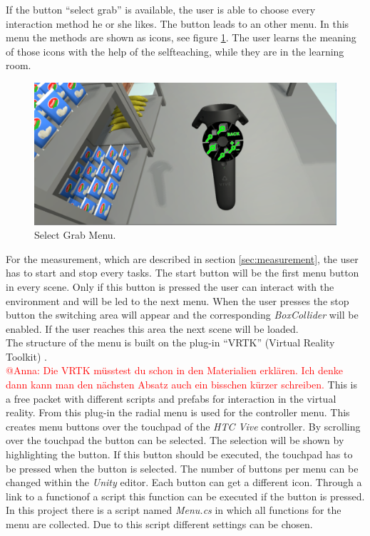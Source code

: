If the button ``select grab'' is available, the user is able to choose every interaction method he or she likes. The button leads to an other menu. In this menu the methods are shown as icons, see figure \ref{fig:grabMenu}. The user learns the meaning of those icons with the help of the selfteaching, while they are in the learning room. 

\begin{figure}[H] 
	\center 
	\includegraphics[width=12cm]{Images/Menu2.PNG}
	\caption[Select Grab Menu.]{Select Grab Menu.}
	\label{fig:grabMenu}
\end{figure}

For the measurement, which are described in section \ref{sec:measurement}, the user has to start and stop every tasks. The start button will be the first menu button in every scene. Only if this button is pressed the user can interact with the environment and will be led to the next menu. When the user presses the stop button the switching area will appear and the corresponding \textit{BoxCollider} \cite{website:BoxCollider} will be enabled. If the user reaches this area the next scene will be loaded.\\
The structure of the menu is built on the plug-in ``VRTK'' (Virtual Reality Toolkit) \cite{asset_VRTK} \cite{VRTK}.\\
\textcolor{red}{@Anna: Die VRTK müsstest du schon in den Materialien erklären. Ich denke dann kann man den nächsten Absatz auch ein bisschen kürzer schreiben.}
This is a free packet with different scripts and prefabs for interaction in the virtual reality. From this plug-in the radial menu is used for the controller menu. This creates menu buttons over the touchpad of the \textit{HTC Vive} controller. By scrolling over the touchpad the button can be selected. The selection will be shown by highlighting the button. If this button should be executed, the touchpad has to be pressed when the button is selected. The number of buttons per menu can be changed within the \textit{Unity} editor. Each button can get a different icon. Through a link to a functionof a script this function can be executed if the button is pressed. In this project there is a script named \textit{Menu.cs} in which all functions for the menu are collected. Due to this script different settings can be chosen.


